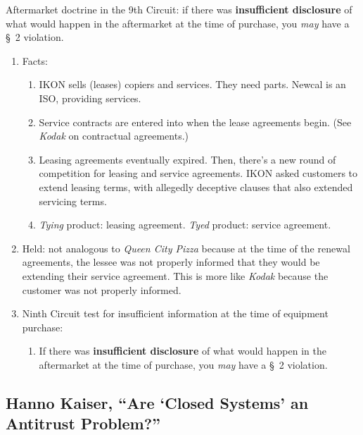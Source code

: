 Aftermarket doctrine in the 9th Circuit: if there was \textbf{insufficient 
disclosure} of what would happen in the aftermarket at the time of purchase, 
you \emph{may} have a \S\ 2 violation.

\begin{enumerate}
    \item Facts:
    \begin{enumerate}
        \item IKON sells (leases) copiers and services. They need parts. 
        Newcal is an ISO, providing services.
        \item Service contracts are entered into when the lease agreements 
        begin. (See \emph{Kodak} on contractual agreements.)
        \item Leasing agreements eventually expired. Then, there's a new round 
        of competition for leasing and service agreements. IKON asked 
        customers to extend leasing terms, with allegedly deceptive clauses 
        that also extended servicing terms.
        \item \emph{Tying} product: leasing agreement. \emph{Tyed} product: 
        service agreement.
    \end{enumerate}
    \item Held: not analogous to \emph{Queen City Pizza} because at the time 
    of the renewal agreements, the lessee was not properly informed that they 
    would be extending their service agreement. This is more like \emph{Kodak} 
    because the customer was not properly informed.
    \item Ninth Circuit test for insufficient information at the time of 
    equipment purchase:
    \begin{enumerate}
        \item If there was \textbf{insufficient disclosure} of what would 
        happen in the aftermarket at the time of purchase, you \emph{may} have 
        a \S\ 2 violation.
    \end{enumerate}
\end{enumerate}

\subsection{Hanno Kaiser, ``Are `Closed Systems' an Antitrust Problem?''}

